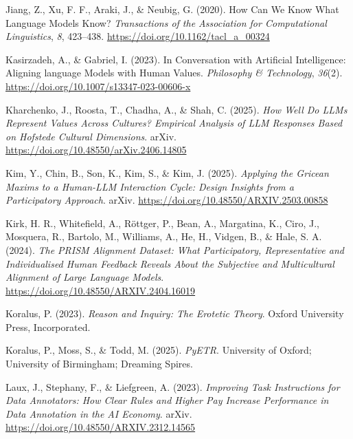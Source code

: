 \documentclass[
  12pt,
]{article}
\newlength{\cslhangindent}
\newenvironment{CSLReferences}[2] %
 {\begin{list}{}{%
  \setlength{\itemindent}{0pt}
  \setlength{\leftmargin}{0pt}
  \setlength{\parsep}{0pt}
  \ifodd #1
   \setlength{\leftmargin}{\cslhangindent}
   \setlength{\itemindent}{-1\cslhangindent}
  \fi
  \setlength{\itemsep}{#2\baselineskip}}}
 {\end{list}}
\begin{document}
\begin{CSLReferences}{1}{0}
Jiang, Z., Xu, F. F., Araki, J., \& Neubig, G. (2020). How {Can} {We} {Know} {What} {Language} {Models} {Know}? \emph{Transactions of the Association for Computational Linguistics}, \emph{8}, 423--438. \url{https://doi.org/10.1162/tacl_a_00324}

Kasirzadeh, A., \& Gabriel, I. (2023). In {Conversation} with {Artificial} {Intelligence}: {Aligning} language {Models} with {Human} {Values}. \emph{Philosophy \& Technology}, \emph{36}(2). \url{https://doi.org/10.1007/s13347-023-00606-x}

Kharchenko, J., Roosta, T., Chadha, A., \& Shah, C. (2025). \emph{How {Well} {Do} {LLMs} {Represent} {Values} {Across} {Cultures}? {Empirical} {Analysis} of {LLM} {Responses} {Based} on {Hofstede} {Cultural} {Dimensions}}. arXiv. \url{https://doi.org/10.48550/arXiv.2406.14805}

Kim, Y., Chin, B., Son, K., Kim, S., \& Kim, J. (2025). \emph{Applying the {Gricean} {Maxims} to a {Human}-{LLM} {Interaction} {Cycle}: {Design} {Insights} from a {Participatory} {Approach}}. arXiv. \url{https://doi.org/10.48550/ARXIV.2503.00858}

Kirk, H. R., Whitefield, A., Röttger, P., Bean, A., Margatina, K., Ciro, J., Mosquera, R., Bartolo, M., Williams, A., He, H., Vidgen, B., \& Hale, S. A. (2024). \emph{The {PRISM} {Alignment} {Dataset}: {What} {Participatory}, {Representative} and {Individualised} {Human} {Feedback} {Reveals} {About} the {Subjective} and {Multicultural} {Alignment} of {Large} {Language} {Models}}. \url{https://doi.org/10.48550/ARXIV.2404.16019}

Koralus, P. (2023). \emph{Reason and {Inquiry}: {The} {Erotetic} {Theory}}. Oxford University Press, Incorporated.

Koralus, P., Moss, S., \& Todd, M. (2025). \emph{{PyETR}}. University of Oxford; University of Birmingham; Dreaming Spires.

Laux, J., Stephany, F., \& Liefgreen, A. (2023). \emph{Improving {Task} {Instructions} for {Data} {Annotators}: {How} {Clear} {Rules} and {Higher} {Pay} {Increase} {Performance} in {Data} {Annotation} in the {AI} {Economy}}. arXiv. \url{https://doi.org/10.48550/ARXIV.2312.14565}


\end{CSLReferences}
\end{document}
